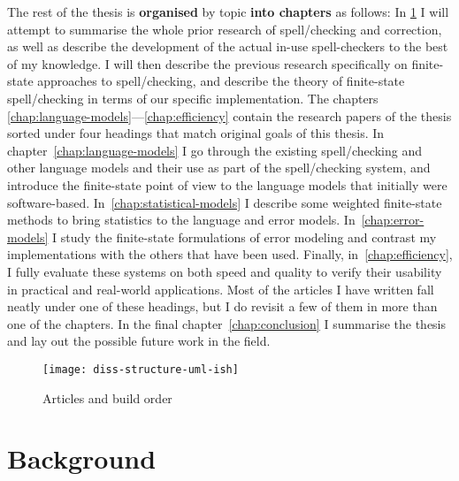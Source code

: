 \documentclass[officiallayout]{unihelcompling}
\begin{document}
The rest of the thesis is \textbf{organised} by topic \textbf{into chapters} as
follows: In \ref{chap:background} I will attempt to summarise the whole prior
research of spell\-/checking and correction, as well as describe the
development of the actual in-use spell-checkers to the best of my knowledge. I will
then describe the previous research specifically on finite-state approaches to
spell\-/checking, and describe the theory of finite-state spell\-/checking in
terms of our specific implementation. The
chapters \ref{chap:language-models}---\ref{chap:efficiency} contain the
research papers of the thesis sorted under four headings that match
original goals of this thesis.  In chapter~\ref{chap:language-models} I go through
the existing spell\-/checking and other language models and their use as part
of the spell\-/checking system, and introduce the finite-state point of view to
the language models that initially were software-based.
In~\ref{chap:statistical-models} I describe some weighted finite-state methods
to bring statistics to the language and error models.
In~\ref{chap:error-models} I study the finite-state formulations of error
modeling and contrast my implementations with the others that have been used.
Finally, in~\ref{chap:efficiency}, I fully evaluate these systems on both speed
and quality to verify their usability in practical and real-world applications.
Most of the articles I have written fall neatly under one of these headings,
but I do revisit a few of them in more than one of the chapters. In the final
chapter~\ref{chap:conclusion} I summarise the thesis and lay out the possible
future work in the field.

\begin{figure}
    \texttt{[image: diss-structure-uml-ish]}
    \caption{Articles and build order
    \label{fig:schematic-diagram}}
\end{figure}

\chapter{Background}
\label{chap:background}
\end{document}
